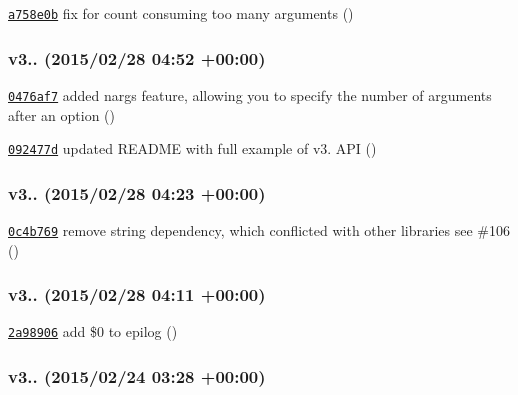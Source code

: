 \begin{DoxyItemize}
\item \href{https://github.com/bcoe/yargs/commit/a758e0b2556184f067cf3d9c4ef886d39817ebd2}{\tt a758e0b} fix for count consuming too many arguments ()
\end{DoxyItemize}

\subsubsection*{v3.. (2015/02/28 04\+:52 +00\+:00)}


\begin{DoxyItemize}
\item \href{https://github.com/bcoe/yargs/commit/0476af757966acf980d998b45108221d4888cfcb}{\tt 0476af7} added nargs feature, allowing you to specify the number of arguments after an option ()
\item \href{https://github.com/bcoe/yargs/commit/092477d7ab3efbf0ba11cede57f7d8cfc70b024f}{\tt 092477d} updated R\+E\+A\+D\+ME with full example of v3. A\+PI ()
\end{DoxyItemize}

\subsubsection*{v3.. (2015/02/28 04\+:23 +00\+:00)}


\begin{DoxyItemize}
\item \href{https://github.com/bcoe/yargs/commit/0c4b769516cd8d93a7c4e5e675628ae0049aa9a8}{\tt 0c4b769} remove string dependency, which conflicted with other libraries see \#106 ()
\end{DoxyItemize}

\subsubsection*{v3.. (2015/02/28 04\+:11 +00\+:00)}


\begin{DoxyItemize}
\item \href{https://github.com/bcoe/yargs/commit/2a9890675821c0e7a12f146ce008b0562cb8ec9a}{\tt 2a98906} add \$0 to epilog ()
\end{DoxyItemize}

\subsubsection*{v3.. (2015/02/24 03\+:28 +00\+:00)}


